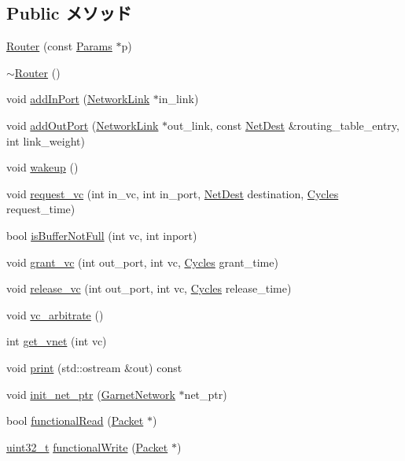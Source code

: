 \subsection*{Public メソッド}
\begin{DoxyCompactItemize}
\item 
\hyperlink{classRouter_a08e8916427569b37de6a373acb130e0d}{Router} (const \hyperlink{classRouter_aefbd30db7d0c203dbe4553fdfe3c2b0e}{Params} $\ast$p)
\item 
\hyperlink{classRouter_ae646b52cde146755b62e42fbcf59a309}{$\sim$Router} ()
\item 
void \hyperlink{classRouter_a861b99bda673a31b1b48132ed9369f28}{addInPort} (\hyperlink{classNetworkLink}{NetworkLink} $\ast$in\_\-link)
\item 
void \hyperlink{classRouter_a8958cd696038e2c830e9ab3445bb1ae5}{addOutPort} (\hyperlink{classNetworkLink}{NetworkLink} $\ast$out\_\-link, const \hyperlink{classNetDest}{NetDest} \&routing\_\-table\_\-entry, int link\_\-weight)
\item 
void \hyperlink{classRouter_ae674290a26ecbd622c5160e38e8a4fe9}{wakeup} ()
\item 
void \hyperlink{classRouter_ac2db714adfe0dfd2c3ac2b88bd6a5308}{request\_\-vc} (int in\_\-vc, int in\_\-port, \hyperlink{classNetDest}{NetDest} destination, \hyperlink{classCycles}{Cycles} request\_\-time)
\item 
bool \hyperlink{classRouter_af3465adbf20f8764ea878ce2d28d2bc8}{isBufferNotFull} (int vc, int inport)
\item 
void \hyperlink{classRouter_af90fb6c473130244fe64e30e61b714f6}{grant\_\-vc} (int out\_\-port, int vc, \hyperlink{classCycles}{Cycles} grant\_\-time)
\item 
void \hyperlink{classRouter_adced7fd7d25eb0d6a869fff14085e8c3}{release\_\-vc} (int out\_\-port, int vc, \hyperlink{classCycles}{Cycles} release\_\-time)
\item 
void \hyperlink{classRouter_a3e82da716c2557efa2e6a293843b4d0a}{vc\_\-arbitrate} ()
\item 
int \hyperlink{classRouter_ae73de77352867d272505f41222809e17}{get\_\-vnet} (int vc)
\item 
void \hyperlink{classRouter_ac55fe386a101fbae38c716067c9966a0}{print} (std::ostream \&out) const 
\item 
void \hyperlink{classRouter_ab5da6a3c41f86ad2993eb11f4894ef00}{init\_\-net\_\-ptr} (\hyperlink{classGarnetNetwork}{GarnetNetwork} $\ast$net\_\-ptr)
\item 
bool \hyperlink{classRouter_a6db56c593ee28a561c47e75a859300dd}{functionalRead} (\hyperlink{classPacket}{Packet} $\ast$)
\item 
\hyperlink{Type_8hh_a435d1572bf3f880d55459d9805097f62}{uint32\_\-t} \hyperlink{classRouter_aba9037f662122b5f2e85647d35670e5c}{functionalWrite} (\hyperlink{classPacket}{Packet} $\ast$)
\end{DoxyCompactItemize}
